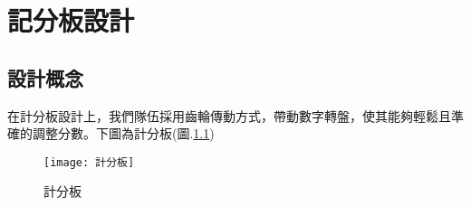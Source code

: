 \chapter{記分板設計}
\section{設計概念}
    在計分板設計上，我們隊伍採用齒輪傳動方式，帶動數字轉盤，使其能夠輕鬆且準確的調整分數。下圖為計分板(圖.\ref{計分板})\\
\begin{figure}[hbt!]
\center
\texttt{[image: 計分板]}
\caption{\Large 計分板}
\label{計分板}
\end{figure}

